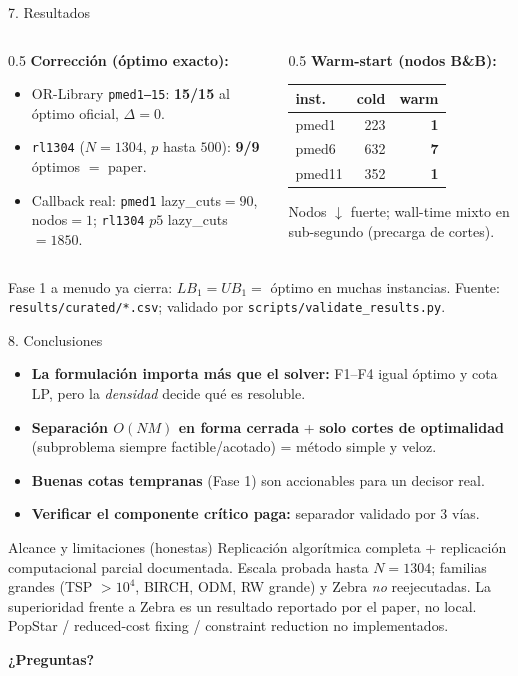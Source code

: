 \documentclass[10pt,aspectratio=169]{beamer}
\begin{document}
\begin{frame}{7. Resultados}
\begin{columns}
\begin{column}{0.5\textwidth}
\textbf{Corrección (óptimo exacto):}
\begin{itemize}
  \item OR-Library \texttt{pmed1–15}: \textbf{15/15} al óptimo oficial, $\Delta=0$.
  \item \texttt{rl1304} ($N{=}1304$, $p$ hasta $500$): \textbf{9/9} óptimos $=$ paper.
  \item Callback real: \texttt{pmed1} lazy\_cuts$=90$, nodos$=1$; \texttt{rl1304} $p5$
        lazy\_cuts$=1850$.
\end{itemize}
\end{column}
\begin{column}{0.5\textwidth}
\textbf{Warm-start (nodos B\&B):}
\begin{center}\small
\begin{tabular}{lrr}
\toprule
inst. & cold & warm \\
\midrule
pmed1  & 223 & \textbf{1} \\
pmed6  & 632 & \textbf{7} \\
pmed11 & 352 & \textbf{1} \\
\bottomrule
\end{tabular}
\end{center}
\footnotesize Nodos $\downarrow$ fuerte; wall-time mixto en sub-segundo (precarga de cortes).
\end{column}
\end{columns}
\vfill
\footnotesize Fase 1 a menudo ya cierra: $LB_1=UB_1=$ óptimo en muchas instancias. Fuente:
\texttt{results/curated/*.csv}; validado por \texttt{scripts/validate\_results.py}.
\end{frame}

\begin{frame}{8. Conclusiones}
\begin{itemize}
  \item \textbf{La formulación importa más que el solver:} F1–F4 igual óptimo y cota LP, pero la
        \emph{densidad} decide qué es resoluble.
  \item \textbf{Separación $O(NM)$ en forma cerrada} + \textbf{solo cortes de optimalidad}
        (subproblema siempre factible/acotado) = método simple y veloz.
  \item \textbf{Buenas cotas tempranas} (Fase 1) son accionables para un decisor real.
  \item \textbf{Verificar el componente crítico paga:} separador validado por 3 vías.
\end{itemize}
\begin{block}{Alcance y limitaciones (honestas)}
Replicación algorítmica completa + replicación computacional parcial documentada. Escala probada
hasta $N=1304$; familias grandes (TSP $>10^4$, BIRCH, ODM, RW grande) y Zebra \emph{no}
reejecutadas. La superioridad frente a Zebra es un resultado reportado por el paper, no local.
PopStar / reduced-cost fixing / constraint reduction no implementados.
\end{block}
\centering \textbf{¿Preguntas?}
\end{frame}
\end{document}
